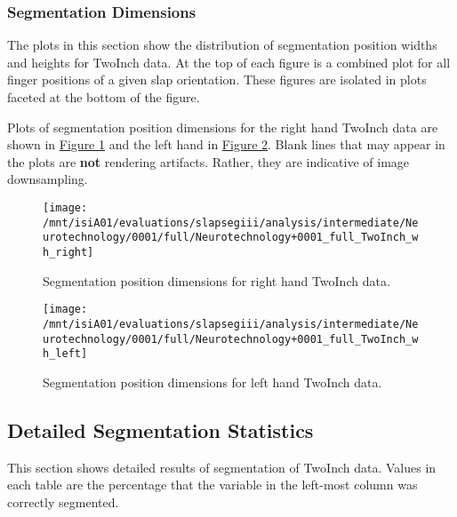 \documentclass[]{article}
\begin{document}
\clearpage

\subsubsection{Segmentation Dimensions}\label{segmentation-dimensions}

The plots in this section show the distribution of segmentation position
widths and heights for TwoInch data. At the top of each figure is a
combined plot for all finger positions of a given slap orientation.
These figures are isolated in plots faceted at the bottom of the figure.

Plots of segmentation position dimensions for the right hand TwoInch
data are shown in \protect\hyperlink{fig:twoinch-wh-right}{Figure
\ref{fig:twoinch-wh-right}} and the left hand in
\protect\hyperlink{fig:twoinch-wh-left}{Figure
\ref{fig:twoinch-wh-left}}. Blank lines that may appear in the plots are
\textbf{not} rendering artifacts. Rather, they are indicative of image
downsampling.

\begin{figure}

{\centering \texttt{[image: /mnt/isiA01/evaluations/slapsegiii/analysis/intermediate/Neurotechnology/0001/full/Neurotechnology+0001\_full\_TwoInch\_wh\_right]} 

}

\caption{Segmentation position dimensions for right hand TwoInch data.}\label{fig:twoinch-wh-right}
\end{figure}

\begin{figure}

{\centering \texttt{[image: /mnt/isiA01/evaluations/slapsegiii/analysis/intermediate/Neurotechnology/0001/full/Neurotechnology+0001\_full\_TwoInch\_wh\_left]} 

}

\caption{Segmentation position dimensions for left hand TwoInch data.}\label{fig:twoinch-wh-left}
\end{figure}

\clearpage

\hypertarget{subsec-twoinch-stats}{\subsection{Detailed Segmentation
Statistics}\label{subsec-twoinch-stats}}

This section shows detailed results of segmentation of TwoInch data.
Values in each table are the percentage that the variable in the
left-most column was correctly segmented.
\end{document}
